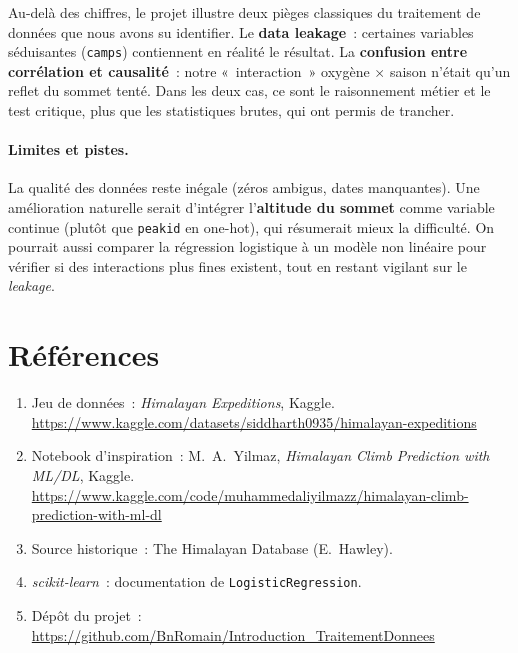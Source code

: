 \documentclass[11pt,a4paper]{article}
\begin{document}
Au-delà des chiffres, le projet illustre deux pièges classiques du traitement
de données que nous avons su identifier. Le \textbf{data leakage}~: certaines
variables séduisantes (\texttt{camps}) contiennent en réalité le résultat.
La \textbf{confusion entre corrélation et causalité}~: notre «~interaction~»
oxygène $\times$ saison n'était qu'un reflet du sommet tenté. Dans les deux
cas, ce sont le raisonnement métier et le test critique, plus que les
statistiques brutes, qui ont permis de trancher.

\paragraph{Limites et pistes.} La qualité des données reste inégale (zéros
ambigus, dates manquantes). Une amélioration naturelle serait d'intégrer
l'\textbf{altitude du sommet} comme variable continue (plutôt que
\texttt{peakid} en one-hot), qui résumerait mieux la difficulté. On pourrait
aussi comparer la régression logistique à un modèle non linéaire pour vérifier
si des interactions plus fines existent, tout en restant vigilant sur le
\textit{leakage}.

\section{Références}

\begin{enumerate}\itemsep0pt
\item\label{ref:data} Jeu de données~: \textit{Himalayan Expeditions}, Kaggle.
\url{https://www.kaggle.com/datasets/siddharth0935/himalayan-expeditions}
\item\label{ref:notebook} Notebook d'inspiration~: M.~A.~Yilmaz,
\textit{Himalayan Climb Prediction with ML/DL}, Kaggle.
\url{https://www.kaggle.com/code/muhammedaliyilmazz/himalayan-climb-prediction-with-ml-dl}
\item\label{ref:hawley} Source historique~: The Himalayan Database (E.~Hawley).
\item\label{ref:sklearn} \textit{scikit-learn}~: documentation de
\texttt{LogisticRegression}.
\item\label{ref:repo} Dépôt du projet~:
\url{https://github.com/BnRomain/Introduction_TraitementDonnees}
\end{enumerate}
\end{document}
